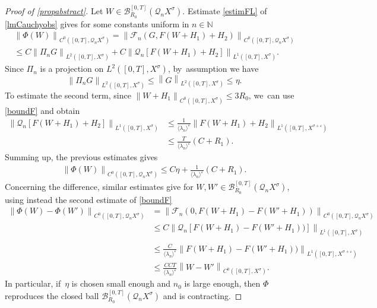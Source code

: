 \documentclass[JEP,XML,SOM,Unicode,published]{cedram}
\theoremstyle{definition}
\let\mc\mathcal
\let\veps\varepsilon
\newcommand{\B}{\mc{B}}
\newcommand{\N}{\mathbb{N}}
\newcommand{\Q}{\mathcal{Q}}
\providecommand{\inn}[1]{\langle#1\rangle}
\newcommand\nor[2]{\left\|#1\right\|_{#2}}
\newcommand\FL{\mathcal{F}_{n}}
\begin{document}
\begin{proof}[Proof of \cref{propabstract}]
Let $W\in \B_{R_{0}}^{[0,T]}(\Q_n X^{\sigma})$. Estimate \eqref{estimFL} of \cref{lmCauchyobs} gives for some constants uniform in $n\in \N$\vspace*{-5pt}
\begin{multline*}
\nor{\Phi(W)}{C^{0}([0,T],\Q_{n}X^{\sigma})}=\nor{\FL(G,F(W+H_{1})+H_{2})}{C^{0}([0,T],\Q_{n}X^{\sigma})}\\
\leq C \nor{\Pi_{n}G}{L^{2}([0,T],X^{\sigma})}+C\nor{\Q_{n}\left[ F(W+H_{1})+H_{2}\right]}{L^{1}([0,T],X^{\sigma})}.
\end{multline*}
Since $\Pi_{n}$ is a projection on $L^2([0,T],X^{\sigma})$, by~assumption we have\vspace*{-3pt}
\[
\nor{\Pi_{n}G}{L^{2}([0,T],X^{\sigma})}\leq \nor{G}{L^{2}([0,T],X^{\sigma})}\leq \eta.
\]
To estimate the second term, since $\nor{W+H_{1}}{C^{0}([0,T],X^{\sigma})}\leq 3R_{0}$, we~can use \eqref{boundF} and obtain\vspace*{-3pt}
\begin{equation}\label{estimFinPhi}
\begin{aligned}
\nor{\Q_{n}\left[ F(W+H_{1})\!+\!H_{2}\right]}{L^{1}([0,T],X^{\sigma})}&\leq \frac{1}{\inn{\lambda_n}^{\veps}} \nor{F(W+H_{1})\!+\!H_{2}}{L^{1}([0,T],X^{\sigma+\veps})}\\
&\leq \frac{T}{\inn{\lambda_n}^{\veps}}(C+R_{1}).
\end{aligned}
\end{equation}
Summing up, the previous estimates gives
\begin{align*}
\nor{\Phi(W)}{C^{0}([0,T],\Q_{n}X^{\sigma})}\leq C\eta+ \frac{1}{\inn{\lambda_n}^{\veps}} \left(C+R_{1}\right).
\end{align*}
Concerning the difference, similar estimates give for $W, W'\in \B_{R_{0}}^{[0,T]}(\Q_n X^{\sigma})$, using instead the second estimate of \eqref{boundF}
\begin{align}
\nonumber\nor{\Phi(W)-\Phi(W')}{C^{0}([0,T],\Q_{n}X^{\sigma})}&=\nor{\FL(0,F(W+H_{1})-F(W'+H_{1}))}{C^{0}([0,T],\Q_{n}X^{\sigma})}\\
\nonumber&\leq C\nor{\Q_{n}\left[ F(W+H_{1})-F(W'+H_{1}))\right]}{L^{1}([0,T],X^{\sigma})}\\[-7pt]
\label{bounddiffW}\\[-10pt]
\nonumber&\leq \frac{C}{\inn{\lambda_n}^{\veps}} \nor{F(W+H_{1})-F(W'+H_{1}))}{L^{1}([0,T],X^{\sigma+\veps})}\\
\nonumber&\leq \frac{CCT}{\inn{\lambda_n}^{\veps}} \nor{W-W'}{C^{0}([0,T],X^{\sigma})}.
\end{align}
In particular, if~$\eta$ is chosen small enough and $n_{0}$ is large enough, then $\Phi$ reproduces the closed ball $\B_{R_{0}}^{[0,T]}(\Q_n X^{\sigma})$ and is contracting.


\end{proof}
\end{document}
